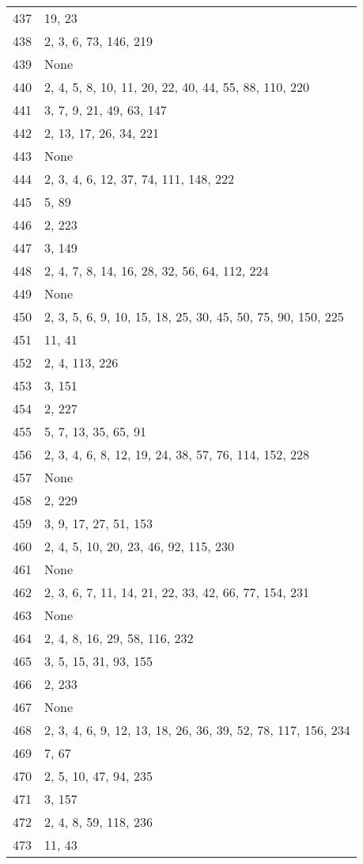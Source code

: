 \documentclass[12pt]{article}
\begin{document}
\begin{tabular}{|r|l|}
437 & 19, 23 \\ 
438 & 2, 3, 6, 73, 146, 219 \\ 
439 & None \\ 
440 & 2, 4, 5, 8, 10, 11,  20, 22, 40, 44, 55, 88, 110, 220 \\ 
441 & 3, 7, 9, 21, 49,  63, 147 \\ 
442 & 2, 13, 17, 26, 34, 221 \\ 
443 & None \\ 
444 & 2, 3, 4, 6, 12,  37, 74, 111, 148, 222 \\ 
445 & 5, 89 \\ 
446 & 2, 223 \\ 
447 & 3, 149 \\ 
448 & 2, 4, 7, 8, 14, 16, 28, 32, 56, 64, 112, 224 \\ 
449 & None \\ 
450 & 2, 3, 5, 6, 9, 10, 15, 18, 25, 30, 45, 50, 75, 90, 150, 225 \\ 
451 & 11, 41 \\ 
452 & 2, 4, 113, 226 \\ 
453 & 3, 151 \\ 
454 & 2, 227 \\ 
455 & 5, 7, 13,  35, 65, 91 \\ 
456 & 2, 3, 4, 6, 8, 12, 19, 24, 38,  57, 76, 114, 152, 228 \\ 
457 & None \\ 
458 & 2, 229 \\ 
459 & 3, 9, 17, 27, 51, 153 \\ 
460 & 2, 4, 5, 10, 20, 23, 46, 92, 115, 230 \\ 
461 & None \\ 
462 & 2, 3, 6,  7, 11, 14, 21, 22, 33, 42, 66, 77, 154, 231 \\ 
463 & None \\ 
464 & 2, 4, 8, 16, 29, 58, 116, 232 \\ 
465 & 3, 5, 15, 31, 93, 155 \\ 
466 & 2, 233 \\ 
467 & None \\ 
468 & 2, 3, 4, 6, 9,  12, 13, 18,  26, 36, 39, 52, 78, 117, 156, 234 \\ 
469 & 7, 67 \\ 
470 & 2, 5, 10, 47, 94,  235 \\ 
471 & 3, 157 \\ 
472 & 2, 4, 8, 59, 118, 236 \\ 
473 & 11, 43 \\ 

\end{tabular}
\end{document}
